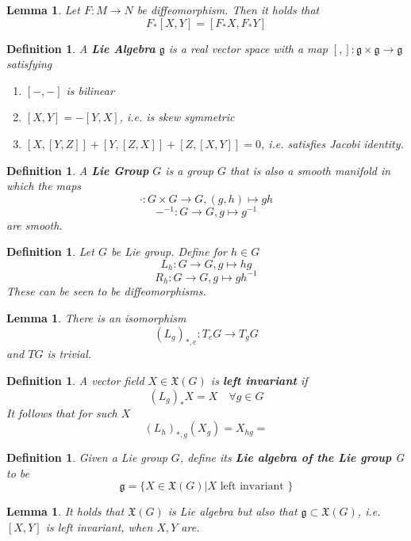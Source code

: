 \documentclass{article}
\numberwithin{theorem}{section}
\newtheorem{lemma}[theorem]{Lemma}
\newtheorem{definition}[theorem]{Definition}
\newcommand{\1}{\mathds{1}}
\begin{document}
\begin{lemma}
    Let $F: M \to N$ be diffeomorphism. Then it holds that 
    \[ F_*[X,Y] = [F_*X, F_*Y ] \]
\end{lemma}

\begin{definition}
    A \textbf{Lie Algebra} $\mathfrak{g}$ is a real vector space with a map $[,] : \mathfrak{g} \times \mathfrak{g} \to \mathfrak{g}$ satisfying 
    \begin{enumerate}
        \item $[-, - ]$ is bilinear 
        \item $[X,Y]= - [Y,X] $, i.e. is skew symmetric 
        \item $[X, [Y,Z]] + [Y,[Z,X]] + [Z,[X,Y]] = 0 $, i.e. satisfies Jacobi identity. 
    \end{enumerate}
\end{definition}

\begin{definition}
    A \textbf{Lie Group} $G$ is a group $G$ that is also a smooth manifold in which the maps 
    \[ \cdot : G \times G \to G, (g,h) \mapsto gh  \]
    \[ -^{-1} : G \to G, g \mapsto g^{-1} \]
    are smooth. 
\end{definition}

\begin{definition}
    Let $G$ be Lie group. Define for $h \in G$
    \[ L_h : G \to G, g \mapsto hg \]
    \[ R_h : G \to G, g \mapsto gh^{-1} \]
    These can be seen to be diffeomorphisms. 
\end{definition}

\begin{lemma}
    There is an isomorphism 
    \[ (L_g)_{*, e} : T_eG \to T_gG \]
    and $TG$ is trivial. 
\end{lemma}

\begin{definition}
    A vector field $X \in \mathfrak{X}(G)$ is \textbf{left invariant} if 
    \[ (L_g)_* X = X \quad \forall g \in G \]
    It follows that for such $X$ 
    \[ (L_h)_{*,g}(X_g) = X_{hg} = \]
\end{definition}

\begin{definition}
    Given a Lie group $G$, define its \textbf{Lie algebra of the Lie group} G to be 
    \[ \mathfrak{g} = \{ X \in \mathfrak{X}(G) | X \text{ left invariant } \} \]
\end{definition}

\begin{lemma}
    It holds that $\mathfrak{X}(G)$ is Lie algebra but also that $\mathfrak{g} \subset \mathfrak{X}(G)$, i.e. $[X,Y]$ is left invariant, when $X,Y$ are. 
\end{lemma}
\end{document}
